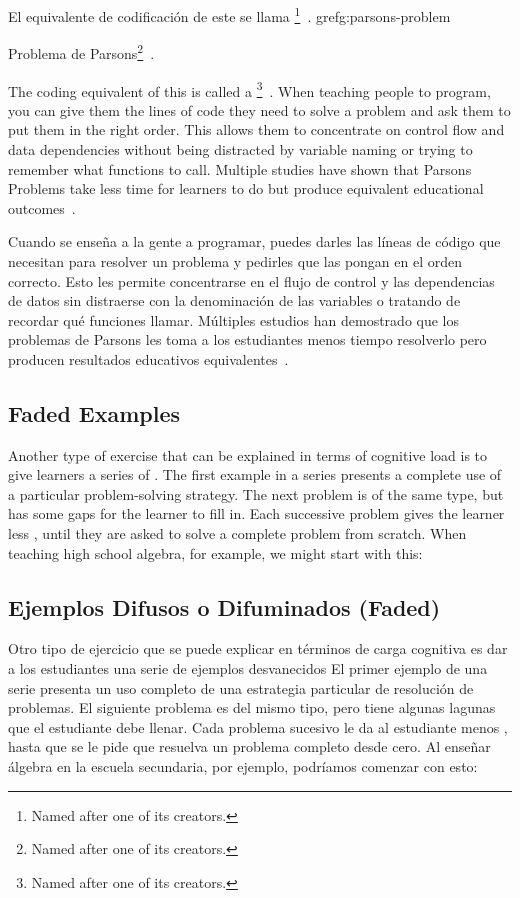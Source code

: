 El equivalente de codificación de este
se llama \footnote{Named after one of its creators.}~\cite{Pars2006}. gref{g:parsons-problem}{Problema de Parsons\footnote{Named after one of its creators.}~\cite{Pars2006}.


The coding equivalent of this
is called a \footnote{Named after one of its creators.}~\cite{Pars2006}.
When teaching people to program,
you can give them the lines of code they need to solve a problem
and ask them to put them in the right order.
This allows them to concentrate on control flow and data dependencies
without being distracted by variable naming or trying to remember what functions to call.
Multiple studies have shown that Parsons Problems take less time for learners to do
but produce equivalent educational outcomes~\cite{Eric2017}.

Cuando se enseña a la gente a programar,
puedes darles las líneas de código que necesitan para resolver un problema
y pedirles que las pongan en el orden correcto.
Esto les permite concentrarse en el flujo de control y las dependencias de datos
sin distraerse con la denominación de las variables o tratando de recordar qué funciones llamar.
Múltiples estudios han demostrado que los problemas de Parsons les toma a los estudiantes menos tiempo resolverlo
pero producen resultados educativos equivalentes~\cite{Eric2017}.


\subsection*{Faded Examples}

Another type of exercise that can be explained in terms of cognitive load
is to give learners a series of .
The first example in a series presents a complete use of a particular problem-solving strategy.
The next problem is of the same type,
but has some gaps for the learner to fill in.
Each successive problem gives the learner less ,
until they are asked to solve a complete problem from scratch.
When teaching high school algebra,
for example,
we might start with this:

\subsection*{Ejemplos Difusos o Difuminados (Faded)}

Otro tipo de ejercicio que se puede explicar en términos de carga cognitiva es dar a los estudiantes una serie de ejemplos desvanecidos 
El primer ejemplo de una serie presenta un uso completo de una estrategia particular de resolución de problemas. El siguiente problema es del mismo tipo, pero tiene algunas lagunas que el estudiante debe llenar. Cada problema sucesivo le da al estudiante menos ,
hasta que se le pide que resuelva un problema completo desde cero. Al enseñar álgebra en la escuela secundaria, por ejemplo, podríamos comenzar con esto:


}
